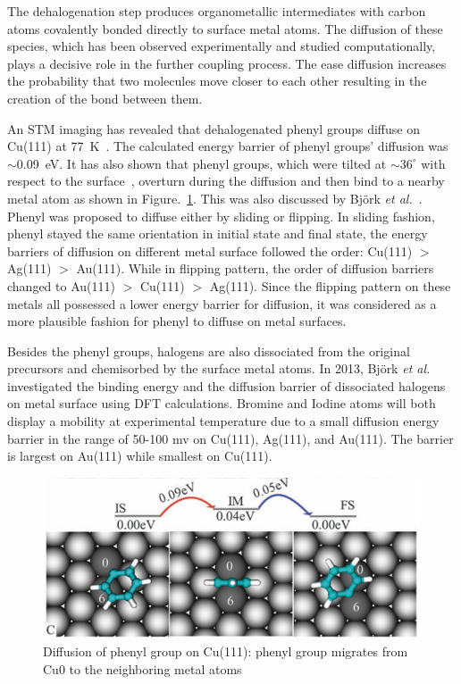 \documentclass[%
 reprint,
 amsmath,amssymb,
 aps,
prb,
]{revtex4-2}
\begin{document}
The dehalogenation step produces organometallic intermediates with carbon atoms covalently bonded directly to surface metal atoms. 
The diffusion of these species, which has been observed experimentally and studied computationally, plays a decisive role in the further coupling process. 
The ease diffusion increases the probability that two molecules move closer to each other resulting in the creation of the bond between them.

An STM imaging has revealed that dehalogenated phenyl groups diffuse on Cu(111) at 77~K~\cite{langm01}. The calculated energy barrier of phenyl groups' diffusion was $\sim$0.09~eV. 
It has also shown that phenyl groups, which were tilted at $\sim 36^\circ$ with respect to the surface~\cite{pccp2010}, overturn during the diffusion and then bind to a nearby metal atom as shown in Figure.~\ref{fig:4}. This was also discussed by Björk \textit{et al.}~\cite{jacs2013}. Phenyl was proposed to diffuse either by sliding or flipping. In sliding fashion, phenyl stayed the same orientation in initial state and final state, the energy barriers of diffusion on different metal surface followed the order: Cu(111) $>$ Ag(111) $>$ Au(111). While in flipping pattern, the order of diffusion barriers changed to Au(111) $>$ Cu(111) $>$ Ag(111). Since the flipping pattern on these metals all possessed a lower energy barrier for diffusion, it was considered as a more plausible fashion for phenyl to diffuse on metal surfaces. 

Besides the phenyl groups, halogens are also dissociated from the original precursors and chemisorbed by the surface metal atoms. In 2013, Björk \textit{et al.}~\cite{jacs2013} investigated the binding energy and the diffusion barrier of dissociated halogens on metal surface using DFT calculations. Bromine and Iodine atoms will both display a mobility at experimental temperature due to a small diffusion energy barrier in the range of 50-100 mv on Cu(111), Ag(111), and Au(111). The barrier is largest on Au(111) while smallest on Cu(111). 

\begin{figure}[htb]
\centering
\includegraphics[width=0.75\columnwidth]{Fig/overturn.png}
\caption{Diffusion of phenyl group on Cu(111): phenyl group migrates from Cu0 to the neighboring metal atoms} %
\label{fig:4}
\end{figure}
\end{document}

